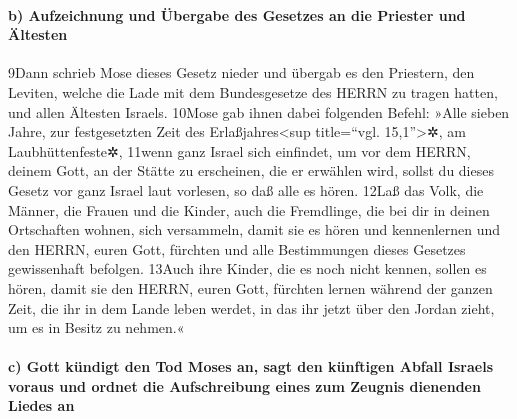 \hypertarget{b-aufzeichnung-und-uxfcbergabe-des-gesetzes-an-die-priester-und-uxe4ltesten}{%
\paragraph{b) Aufzeichnung und Übergabe des Gesetzes an die Priester und
Ältesten}\label{b-aufzeichnung-und-uxfcbergabe-des-gesetzes-an-die-priester-und-uxe4ltesten}}

9Dann schrieb Mose dieses Gesetz nieder und übergab es den Priestern,
den Leviten, welche die Lade mit dem Bundesgesetze des HERRN zu tragen
hatten, und allen Ältesten Israels. 10Mose gab ihnen dabei folgenden
Befehl: »Alle sieben Jahre, zur festgesetzten Zeit des
Erlaßjahres\textless sup title=``vgl. 15,1''\textgreater✲, am
Laubhüttenfeste✲, 11wenn ganz Israel sich einfindet, um vor dem HERRN,
deinem Gott, an der Stätte zu erscheinen, die er erwählen wird, sollst
du dieses Gesetz vor ganz Israel laut vorlesen, so daß alle es hören.
12Laß das Volk, die Männer, die Frauen und die Kinder, auch die
Fremdlinge, die bei dir in deinen Ortschaften wohnen, sich versammeln,
damit sie es hören und kennenlernen und den HERRN, euren Gott, fürchten
und alle Bestimmungen dieses Gesetzes gewissenhaft befolgen. 13Auch ihre
Kinder, die es noch nicht kennen, sollen es hören, damit sie den HERRN,
euren Gott, fürchten lernen während der ganzen Zeit, die ihr in dem
Lande leben werdet, in das ihr jetzt über den Jordan zieht, um es in
Besitz zu nehmen.«

\hypertarget{c-gott-kuxfcndigt-den-tod-moses-an-sagt-den-kuxfcnftigen-abfall-israels-voraus-und-ordnet-die-aufschreibung-eines-zum-zeugnis-dienenden-liedes-an}{%
\paragraph{c) Gott kündigt den Tod Moses an, sagt den künftigen Abfall
Israels voraus und ordnet die Aufschreibung eines zum Zeugnis dienenden
Liedes
an}\label{c-gott-kuxfcndigt-den-tod-moses-an-sagt-den-kuxfcnftigen-abfall-israels-voraus-und-ordnet-die-aufschreibung-eines-zum-zeugnis-dienenden-liedes-an}}

